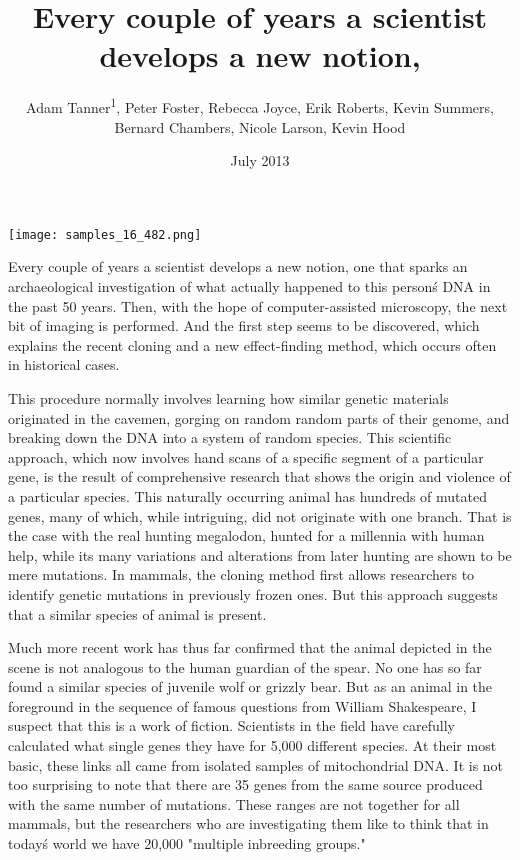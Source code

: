 \documentclass{article}
\title{Every couple of years a scientist develops a new notion,}
\author{Adam Tanner\textsuperscript{1},  Peter Foster,  Rebecca Joyce,  Erik Roberts,  Kevin Summers,  Bernard Chambers,  Nicole Larson,  Kevin Hood}
\affil{\textsuperscript{1}Louisiana State University}
\date{July 2013}
\begin{document}
\maketitle

\begin{center}
\begin{minipage}{0.75\linewidth}
\texttt{[image: samples\_16\_482.png]}
\end{minipage}
\end{center}

Every couple of years a scientist develops a new notion, one that sparks an archaeological investigation of what actually happened to this person\'s DNA in the past 50 years. Then, with the hope of computer-assisted microscopy, the next bit of imaging is performed. And the first step seems to be discovered, which explains the recent cloning and a new effect-finding method, which occurs often in historical cases.

This procedure normally involves learning how similar genetic materials originated in the cavemen, gorging on random random parts of their genome, and breaking down the DNA into a system of random species. This scientific approach, which now involves hand scans of a specific segment of a particular gene, is the result of comprehensive research that shows the origin and violence of a particular species. This naturally occurring animal has hundreds of mutated genes, many of which, while intriguing, did not originate with one branch. That is the case with the real hunting megalodon, hunted for a millennia with human help, while its many variations and alterations from later hunting are shown to be mere mutations. In mammals, the cloning method first allows researchers to identify genetic mutations in previously frozen ones. But this approach suggests that a similar species of animal is present.

Much more recent work has thus far confirmed that the animal depicted in the scene is not analogous to the human guardian of the spear. No one has so far found a similar species of juvenile wolf or grizzly bear. But as an animal in the foreground in the sequence of famous questions from William Shakespeare, I suspect that this is a work of fiction. Scientists in the field have carefully calculated what single genes they have for 5,000 different species. At their most basic, these links all came from isolated samples of mitochondrial DNA. It is not too surprising to note that there are 35 genes from the same source produced with the same number of mutations. These ranges are not together for all mammals, but the researchers who are investigating them like to think that in today\'s world we have 20,000 "multiple inbreeding groups."
\end{document}
